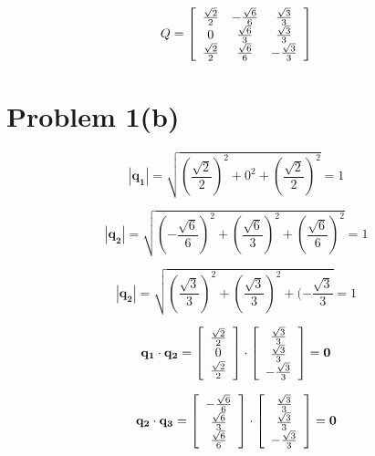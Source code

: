 \documentclass{article}
\begin{document}
\[
Q = \left[\begin{array}{*{4}c}
    \frac{\sqrt{2}}{2} & -\frac{\sqrt{6}}{6} & \frac{\sqrt{3}}{3} \\
    0 & \frac{\sqrt{6}}{3} & \frac{\sqrt{3}}{3} \\
    \frac{\sqrt{2}}{2} & \frac{\sqrt{6}}{6} & - \frac{\sqrt{3}}{3}

 \end{array}\right]
\]


\section*{Problem 1(b)}

$$|\mathbf{q_1}| = \sqrt{(\frac{\sqrt{2}}{2})^2 +
    0^2 +
    (\frac{\sqrt{2}}{2})^2 } = 1$$

$$|\mathbf{q_2}| = \sqrt{(-\frac{\sqrt{6}}{6})^2 +
    (\frac{\sqrt{6}}{3})^2 +
    (\frac{\sqrt{6}}{6})^2 } = 1$$


$$|\mathbf{q_2}| = \sqrt{(\frac{\sqrt{3}}{3})^2 +
    (\frac{\sqrt{3}}{3})^2 +
    (-\frac{\sqrt{3}}{3} } = 1$$


$$
\mathbf{q_1} \cdot \mathbf{q_2} = 
\left[ \begin{array} {*{3}c} 
    \frac{\sqrt{2}}{2} \\
    0 \\
    \frac{\sqrt{2}}{2} \\
\end{array}\right] 
\cdot 
\left[ \begin{array} {*{3}c} 
    \frac{\sqrt{3}}{3} \\
    \frac{\sqrt{3}}{3} \\
    - \frac{\sqrt{3}}{3} \\
\end{array}\right]
= \mathbf{0}
$$

$$
\mathbf{q_2} \cdot \mathbf{q_3} = 
\left[ \begin{array} {*{3}c} 
    -\frac{\sqrt{6}}{6} \\
    \frac{\sqrt{6}}{3} \\
    \frac{\sqrt{6}}{6} \\
\end{array}\right] 
\cdot 
\left[ \begin{array} {*{3}c} 
    \frac{\sqrt{3}}{3} \\
    \frac{\sqrt{3}}{3} \\
    - \frac{\sqrt{3}}{3} \\
\end{array}\right]
= \mathbf{0}
$$
\end{document}
